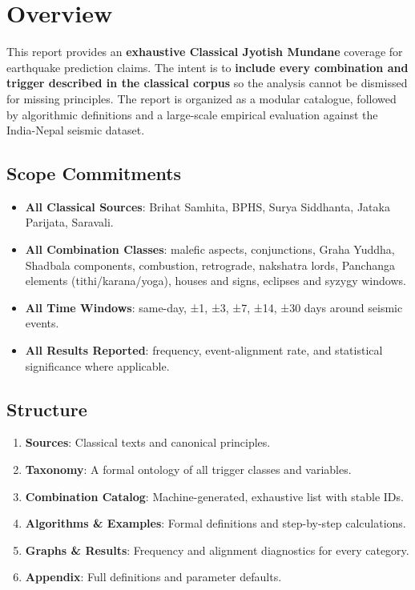 \documentclass[
  11pt,
  a4paper,
  oneside,
  openany]{article}
\providecommand{\tightlist}{%
  \setlength{\itemsep}{0pt}\setlength{\parskip}{0pt}}\usepackage{longtable,booktabs,array}
\begin{document}
\section{Overview}\label{overview}

This report provides an \textbf{exhaustive Classical Jyotish Mundane}
coverage for earthquake prediction claims. The intent is to
\textbf{include every combination and trigger described in the classical
corpus} so the analysis cannot be dismissed for missing principles. The
report is organized as a modular catalogue, followed by algorithmic
definitions and a large-scale empirical evaluation against the
India-Nepal seismic dataset.

\subsection{Scope Commitments}\label{scope-commitments}

\begin{itemize}
\tightlist
\item
  \textbf{All Classical Sources}: Brihat Samhita, BPHS, Surya Siddhanta,
  Jataka Parijata, Saravali.
\item
  \textbf{All Combination Classes}: malefic aspects, conjunctions, Graha
  Yuddha, Shadbala components, combustion, retrograde, nakshatra lords,
  Panchanga elements (tithi/karana/yoga), houses and signs, eclipses and
  syzygy windows.
\item
  \textbf{All Time Windows}: same-day, ±1, ±3, ±7, ±14, ±30 days around
  seismic events.
\item
  \textbf{All Results Reported}: frequency, event-alignment rate, and
  statistical significance where applicable.
\end{itemize}

\subsection{Structure}\label{structure}

\begin{enumerate}
\def\labelenumi{\arabic{enumi}.}
\tightlist
\item
  \textbf{Sources}: Classical texts and canonical principles.
\item
  \textbf{Taxonomy}: A formal ontology of all trigger classes and
  variables.
\item
  \textbf{Combination Catalog}: Machine-generated, exhaustive list with
  stable IDs.
\item
  \textbf{Algorithms \& Examples}: Formal definitions and step-by-step
  calculations.
\item
  \textbf{Graphs \& Results}: Frequency and alignment diagnostics for
  every category.
\item
  \textbf{Appendix}: Full definitions and parameter defaults.
\end{enumerate}
\end{document}
